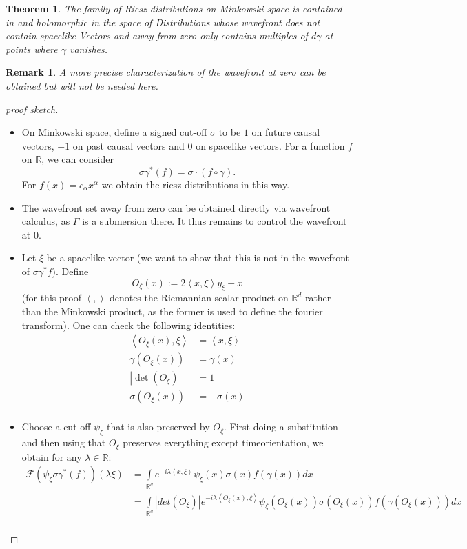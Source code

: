 \documentclass[11pt]{article}
\def\<{\left\langle}
\def\>{\right\rangle}
\def\R{{\mathbb{R}}}
\def\F {\mathcal{F}}
\newtheorem{thm}[df]{Theorem}
\newtheorem{rem}[df]{Remark}
\begin{document}
\begin{thm}
	\label{WFRiesz}
	The family of Riesz distributions on Minkowski space is contained in and holomorphic in the space of Distributions whose wavefront does not contain spacelike Vectors and away from zero only contains multiples of $d\gamma$ at points where $\gamma$ vanishes.
\end{thm}
\begin{rem}
	A more precise characterization of the wavefront at zero can be obtained but will not be needed here.
\end{rem}
\begin{proof}[proof sketch]\hfill
	\begin{itemize}
	\item On Minkowski space, define a signed cut-off $\sigma$ to be $1$ on future causal vectors, $-1$ on past causal vectors and $0$ on spacelike vectors. For a function $f$ on $\R$, we can consider
	\[\sigma\gamma^*(f)=\sigma\cdot (f\circ \gamma).\]
	For $f(x)=c_\alpha x^\alpha$ we obtain the riesz distributions in this way.
	\item The wavefront set away from zero can be obtained directly via wavefront calculus, as $\Gamma$ is a submersion there. It thus remains to control the wavefront at $0$.
	\item Let $\xi$ be a spacelike vector (we want to show that this is not in the wavefront of $\sigma\gamma^*f$). Define
	\[O_\xi(x):=2\<x,\xi\>y_\xi-x\]
	(for this proof $\<,\>$ denotes the Riemannian scalar product on $\R^d$ rather than the Minkowski product, as the former is used to define the fourier transform).
	One can check the following identities:
	\begin{align*}
		\<O_\xi(x),\xi\>&=\<x,\xi\>\\
		\gamma(O_\xi(x))&=\gamma(x)\\
		|\det(O_\xi)|&=1\\
		\sigma(O_\xi(x))&=-\sigma(x)\\
	\end{align*}
	\item Choose a cut-off $\psi_\xi$ that is also preserved by $O_\xi$. First doing a substitution and then using that $O_\xi$ preserves everything except timeorientation, we obtain for any $\lambda\in \R$:
	\begin{align*}
		\F(\psi_\xi\sigma\gamma^*(f))(\lambda\xi)&=\int\limits_{\R^d}e^{-i\lambda\<x,\xi\>}\psi_\xi(x)\sigma(x)f(\gamma(x))dx\\
		&=\int\limits_{\R^d}|det(O_\xi)|e^{-i\lambda\<O_\xi(x),\xi\>}\psi_\xi(O_\xi(x))\sigma(O_\xi(x))f(\gamma(O_\xi(x)))dx\\

\end{align*}
\end{itemize}
\end{proof}
\end{document}
